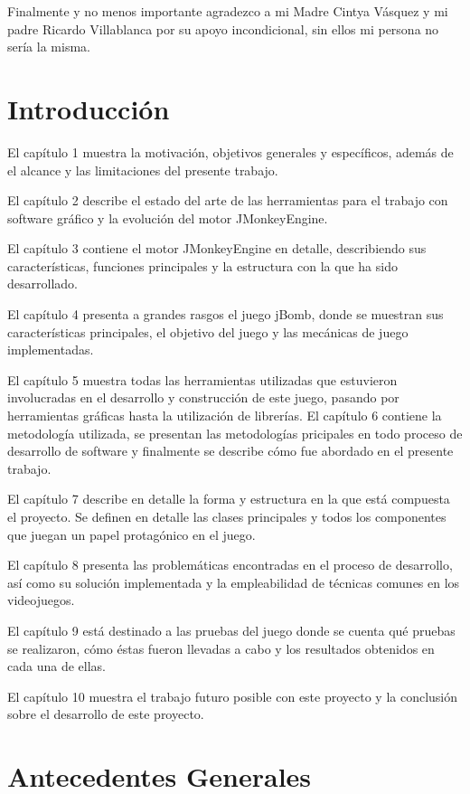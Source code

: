 \documentclass[a4paper,12pt,openany,oneside]{book}
\begin{document}
Finalmente y no menos importante agradezco a mi Madre Cintya Vásquez y mi padre Ricardo Villablanca por su apoyo incondicional, sin ellos mi persona no sería la misma.
\tableofcontents
\listoffigures
\chapter*{Introducción}
\thispagestyle{empty}
El capítulo 1 muestra la motivación, objetivos generales y específicos, además de el alcance y las limitaciones del presente trabajo.

El capítulo 2 describe el estado del arte de las herramientas para el trabajo con software gráfico y la evolución del motor JMonkeyEngine.

El capítulo 3 contiene el motor JMonkeyEngine en detalle, describiendo sus características,  funciones principales y la estructura con la que ha sido desarrollado.

El capítulo 4 presenta a grandes rasgos el juego jBomb, donde se muestran sus características principales, el objetivo del juego y las mecánicas de juego implementadas.

El capítulo 5 muestra todas las herramientas utilizadas que estuvieron involucradas en el desarrollo y construcción de este juego, pasando por herramientas gráficas hasta la utilización de librerías.
\newpage
\thispagestyle{empty}
El capítulo 6 contiene la metodología utilizada, se presentan las metodologías pricipales en todo proceso de desarrollo de software y finalmente se describe cómo fue abordado en el presente trabajo.

El capítulo 7 describe en detalle la forma y estructura en la que está compuesta el proyecto. Se definen en detalle las clases principales y todos los componentes que juegan un papel protagónico en el juego.

El capítulo 8 presenta las problemáticas encontradas en el proceso de desarrollo, así como su solución implementada y la empleabilidad de técnicas comunes en los videojuegos.

El capítulo 9 está destinado a las pruebas del juego donde se cuenta qué pruebas se realizaron, cómo éstas fueron llevadas a cabo y los resultados obtenidos en cada una de ellas.

El capítulo 10 muestra el trabajo futuro posible con este proyecto y la conclusión sobre el desarrollo de este proyecto.
\chapter{Antecedentes Generales}
\end{document}
